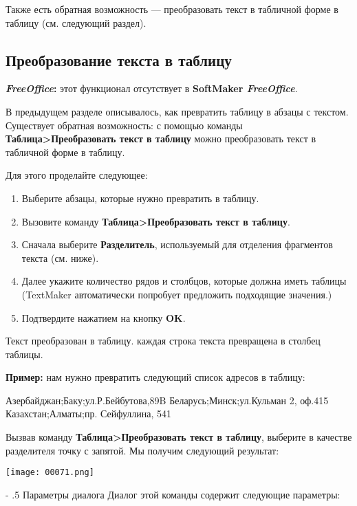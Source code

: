 \documentclass[a4paper,10pt]{article}
\makeatletter
\renewcommand\paragraph{%
   \@startsection{paragraph}{4}{0mm}%
      {-\baselineskip}%
      {.5\baselineskip}%
      {\normalfont\normalsize\bfseries}}
\makeatother
\begin{document}
Также есть обратная возможность --- преобразовать текст в табличной форме в таблицу (см. следующий раздел).

\subsection{Преобразование текста в таблицу}
\begin{mdframed}[backgroundcolor=pink!50]
\textbf{\textit{FreeOffice}:} этот функционал отсутствует в \textbf{SoftMaker \textit{FreeOffice}}.
\end{mdframed}

В предыдущем разделе описывалось, как превратить таблицу в абзацы с текстом. Существует обратная возможность: с помощью команды \textbf{Таблица>Преобразовать текст в таблицу} можно преобразовать текст в табличной форме в таблицу.

Для этого проделайте следующее:

\begin{enumerate}
 \item Выберите абзацы, которые нужно превратить в таблицу.
 \item Вызовите команду \textbf{Таблица>Преобразовать текст в таблицу}.
 \item Сначала выберите \textbf{Разделитель}, используемый для отделения фрагментов текста (см. ниже).
 \item Далее укажите количество рядов и столбцов, которые должна иметь таблицы (TextMaker автоматически попробует предложить подходящие значения.)
 \item Подтвердите нажатием на кнопку \textbf{OK}.
\end{enumerate}

Текст преобразован в таблицу. каждая строка текста превращена в столбец таблицы.

\textbf{Пример:} нам нужно превратить следующий список адресов в таблицу:

Азербайджан;Баку;ул.Р.Бейбутова,89B
Беларусь;Минск;ул.Кульман 2, оф.415
Казахстан;Алматы;пр. Сейфуллина, 541

Вызвав команду \textbf{Таблица>Преобразовать текст в таблицу}, выберите в качестве разделителя точку с запятой. Мы получим следующий результат:

\texttt{[image: 00071.png]}

\paragraph{Параметры диалога}
Диалог этой команды содержит следующие параметры:
\end{document}
